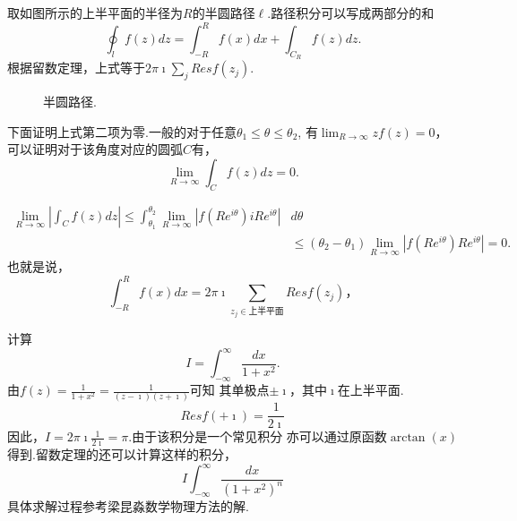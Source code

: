 取如图所示的上半平面的半径为$R$的半圆路径$\ell$.路径积分可以写成两部分的和
\begin{equation}
    \oint_l f(z) d z=\int_{-R}^R f(x) d x+\int_{C_R} f(z) d z .
\end{equation}
根据留数定理，上式等于$2\pi \imath  \sum_j Res f(z_j)$.
%
\begin{figure}[htb!]
    \centering
    
    \caption{半圆路径.}
    \label{fig:semicircle}
\end{figure}
下面证明上式第二项为零.一般的对于任意$\theta_1 \leq \theta \leq \theta_2$, 
有$\lim_{R\to \infty} zf(z) = 0$，可以证明对于该角度对应的圆弧$C$有，
\begin{equation}
    \lim_{R \rightarrow \infty} \int_C f(z) dz = 0 .
\end{equation}

\[
    \begin{aligned}
    \lim _{R \rightarrow \infty}\left|\int_C f(z) d z\right| \leq \int_{\theta_1}^{\theta_2} \lim _{R \rightarrow \infty}\left|f\left(R e^{i \theta}\right) i R e^{i \theta}\right| & d \theta \\
    & \leq\left(\theta_2-\theta_1\right) \lim _{R \rightarrow \infty}\left|f\left(R e^{i \theta}\right) R e^{i \theta}\right|=0 .
    \end{aligned}
\]
也就是说，
\begin{equation}
    \int_{-R}^R f(x) d x = 2\pi \imath  \sum_{z_j\in \textrm{上半平面}} Res f(z_j)，
\end{equation}

\begin{examplebox}{计算\[ 
    I = \int_{-\infty}^{\infty} \frac{dx}{1 + x^2}   .
    \]}
    由$f(z) = \frac{1}{1+ x^2} = \frac{1}{(z-\imath)(z+\imath)}$可知
    其单极点$\pm \imath$，其中$\imath$在上半平面.
    \[
      Res f(+\imath) = \frac{1}{2\imath}  
    \]
    因此，$I = 2\pi \imath  \frac{1}{2\imath} = \pi$.由于该积分是一个常见积分
    亦可以通过原函数$\arctan(x)$得到.留数定理的还可以计算这样的积分，
    \[
      I\int_{-\infty}^{\infty} \frac{dx}{(1 + x^2)^n} 
    \]
    具体求解过程参考梁昆淼数学物理方法的解.
\end{examplebox}


